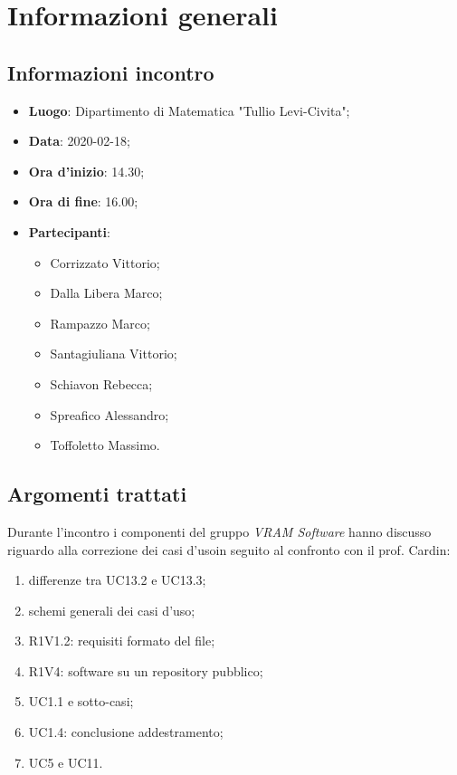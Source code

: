 \section{Informazioni generali}
    \subsection{Informazioni incontro}
        \begin{itemize}
 	    \item \textbf{Luogo}: Dipartimento di Matematica "Tullio Levi-Civita";
		\item \textbf{Data}: 2020-02-18;
		\item \textbf{Ora d'inizio}: 14.30;
		\item \textbf{Ora di fine}: 16.00;
		\item \textbf{Partecipanti}: 
		\begin{itemize}
			\item Corrizzato Vittorio;
			\item Dalla Libera Marco;
			\item Rampazzo Marco;
			\item Santagiuliana Vittorio;
			\item Schiavon Rebecca;
			\item Spreafico Alessandro;
			\item Toffoletto Massimo.
        \end{itemize}
        \end{itemize}
    \subsection{Argomenti trattati}
		Durante l'incontro i componenti del gruppo \textit{VRAM Software} hanno discusso riguardo alla correzione dei casi d'uso\glosp in seguito al confronto con il prof. Cardin:
        \begin{enumerate}
        	\item differenze tra UC13.2 e UC13.3;
        	\item schemi generali dei casi d'uso\glo;
            \item R1V1.2: requisiti formato del file;
            \item R1V4: software su un repository pubblico;
            \item UC1.1 e sotto-casi;
            \item UC1.4: conclusione addestramento;
            \item UC5 e UC11.
        \end{enumerate}
